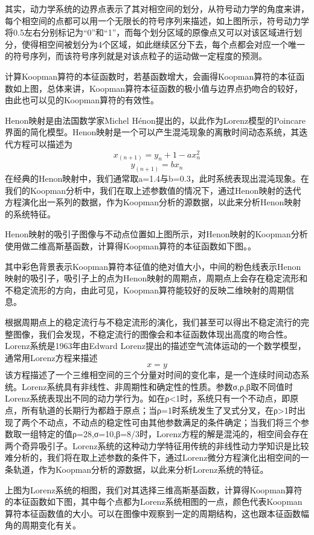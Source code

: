 其实，动力学系统的边界点表示了其对相空间的划分，从符号动力学的角度来讲，每个相空间的点都可以用一个无限长的符号序列来描述，如上图所示，符号动力学将0.5左右分别标记为“0”和“1”，而每个划分区域的原像点又可以对该区域进行划分，使得相空间被划分为4个区域，如此继续区分下去，每个点都会对应一个唯一的符号序列，而该符号序列就是对该点粒子的运动做一定程度的预测。
 
计算Koopman算符的本征函数时，若基函数增大，会画得Koopman算符的本征函数如上图，总体来讲，Koopman算符本征函数的极小值与边界点扔吻合的较好，由此也可以见的Koopman算符的有效性。
 
Henon映射是由法国数学家Michel Hénon提出的，以此作为Lorenz模型的Poincare界面的简化模型。Henon映射是一个可以产生混沌现象的离散时间动态系统，其迭代方程可以描述为
$$x_(n+1)=y_n+1-ax_n^2$$
$$y_(n+1)=bx_n$$
在经典的Henon映射中，我们通常取a=1.4与b=0.3，此时系统表现出混沌现象。在我们的Koopman分析中，我们在取上述参数值的情况下，通过Henon映射的迭代方程演化出一系列的数据，作为Koopman分析的源数据，以此来分析Henon映射的系统特征。
 
Henon映射的吸引子图像与不动点位置如上图所示，对Henon映射的Koopman分析使用做二维高斯基函数，计算得Koopman算符的本征函数如下图。。
 
其中彩色背景表示Koopman算符本征值的绝对值大小，中间的粉色线表示Henon映射的吸引子，吸引子上的点为Henon映射的周期点，周期点上会存在稳定流形和不稳定流形的方向，由此可见，Koopman算符能较好的反映二维映射的周期信息。
 
根据周期点上的稳定流行与不稳定流形的演化，我们甚至可以得出不稳定流行的完整图像，我们会发现，不稳定流行的图像会和本征函数体现出高度的吻合性。
Lorenz系统是1963年由Edward Lorenz提出的描述空气流体运动的一个数学模型，通常用Lorenz方程来描述
$$x=y$$
该方程描述了一个三维相空间的三个分量对时间的变化率，是一个连续时间动态系统。Lorenz系统具有非线性、非周期性和确定性的性质。参数σ,ρ,β取不同值时Lorenz系统表现出不同的动力学行为。如在ρ<1时，系统只有一个不动点，即原点，所有轨道的长期行为都趋于原点；当ρ=1时系统发生了叉式分叉，在ρ>1时出现了两个不动点，不动点的稳定性可由其他参数满足的条件确定；当我们将三个参数取一组特定的值ρ=28,σ=10,β=8/3时，Lorenz方程的解是混沌的，相空间会存在两个奇异吸引子。Lorenz系统的这种动力学特征用传统的非线性动力学知识是比较难分析的，我们将在取上述参数的条件下，通过Lorenz微分方程演化出相空间的一条轨道，作为Koopman分析的源数据，以此来分析Lorenz系统的特征。
 
上图为Lorenz系统的相图，我们对其选择三维高斯基函数，计算得Koopman算符的本征函数如下图，其中每个点都为Lorenz系统相图的一点，颜色代表Koopman算符本征函数值的大小。可以在图像中观察到一定的周期结构，这也跟本征函数幅角的周期变化有关。
 

